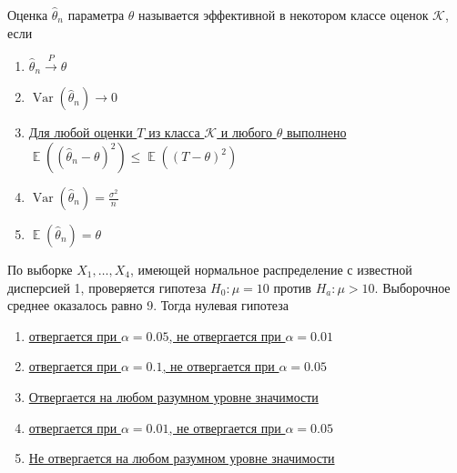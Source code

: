 \documentclass[t]{beamer}
\DeclareMathOperator{\Var}{Var}
\DeclareMathOperator{\E}{\mathbb{E}}
\begin{document}
 \begin{frame} \label{32} 
\begin{block}{32} 

    Оценка  $\hat\theta_n$ параметра $\theta$ называется эффективной в некотором классе оценок $\mathcal{K}$, если


 \end{block} 
\begin{enumerate} 
\item[] \hyperlink{32-No}{\beamergotobutton{} $\hat\theta_n \xrightarrow{P}\theta$}
\item[] \hyperlink{32-No}{\beamergotobutton{} $\Var(\hat\theta_n) \to 0$}
\item[] \hyperlink{32-Yes}{\beamergotobutton{} Для любой оценки $T$ из класса $\mathcal{K}$ и любого $\theta$ выполнено $\E((\hat\theta_n-\theta)^2)\leq \E((T-\theta)^2)$}
\item[] \hyperlink{32-No}{\beamergotobutton{} $\Var(\hat\theta_n)=\frac{\sigma^2}{n}$}
\item[] \hyperlink{32-No}{\beamergotobutton{} $\E(\hat\theta_n)=\theta$}
\end{enumerate} 
\end{frame} 


 \begin{frame} \label{33} 
\begin{block}{33} 

  По выборке $X_1,\ldots,X_{4}$, имеющей нормальное распределение с известной дисперсией 1, проверяется гипотеза $H_0: \mu = 10$ против $H_a: \mu > 10$. Выборочное среднее оказалось равно 9. Тогда нулевая гипотеза


 \end{block} 
\begin{enumerate} 
\item[] \hyperlink{33-No}{\beamergotobutton{} отвергается при $\alpha = 0.05$, не отвергается при $\alpha = 0.01$}
\item[] \hyperlink{33-No}{\beamergotobutton{} отвергается при $\alpha = 0.1$, не отвергается при $\alpha = 0.05$}
\item[] \hyperlink{33-No}{\beamergotobutton{} Отвергается на любом разумном уровне значимости}
\item[] \hyperlink{33-No}{\beamergotobutton{} отвергается при $\alpha = 0.01$, не отвергается при $\alpha = 0.05$}
\item[] \hyperlink{33-Yes}{\beamergotobutton{} Не отвергается на любом разумном уровне значимости}
\end{enumerate} 
\end{frame} 
\end{document}
